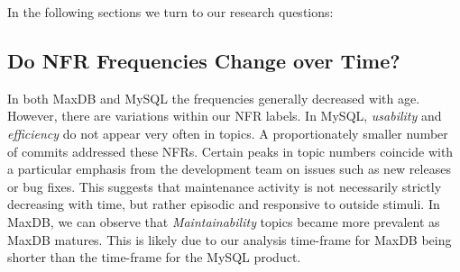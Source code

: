 \documentclass[smallextended]{svjour3}       %
\newcommand{\XXX}[1]{\textcolor{red}{{\it \textbf{[XXX: #1]}}}}
\begin{document}
In the following sections we turn to our research questions:



\subsection{Do NFR Frequencies Change over Time?}

In both MaxDB and MySQL the frequencies generally decreased with age. 
However, there are variations within our NFR labels. In MySQL, \emph{usability} and \emph{efficiency} do not appear very often in topics. 
A proportionately smaller number of commits addressed these NFRs.
Certain peaks in topic numbers coincide with a particular emphasis from the development team on issues such as new releases or bug fixes.
This suggests that maintenance activity is not necessarily strictly decreasing with time, but rather episodic and responsive to outside stimuli. 
In MaxDB, we can observe that \emph{Maintainability} topics became more prevalent as MaxDB matures. 
This is likely due to our analysis time-frame for MaxDB being shorter than the time-frame for the MySQL product. 
\end{document}
